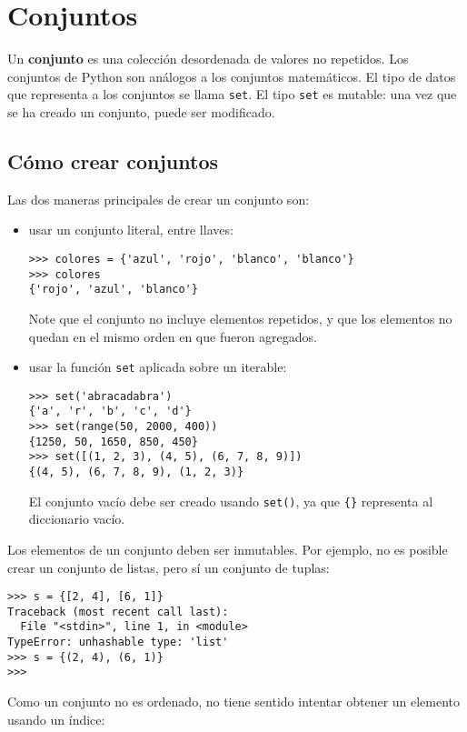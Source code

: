\chapter{Conjuntos}

Un \textbf{conjunto} es una colección desordenada de valores no
repetidos.
Los conjuntos de Python son análogos a los conjuntos matemáticos. El
tipo de datos que representa a los conjuntos se llama \lstinline!set!.
El tipo \lstinline!set! es mutable: una vez que se ha creado un
conjunto, puede ser modificado.

\section{Cómo crear conjuntos}

Las dos maneras principales de crear un conjunto son:

\begin{itemize}
\item
  usar un conjunto literal, entre llaves:
\begin{lstlisting}
>>> colores = {'azul', 'rojo', 'blanco', 'blanco'}
>>> colores
{'rojo', 'azul', 'blanco'}
\end{lstlisting}
  Note que el conjunto no incluye elementos repetidos, y que los
  elementos no quedan en el mismo orden en que fueron agregados.

\item
  usar la función \lstinline!set! aplicada sobre un iterable:
\begin{lstlisting}
>>> set('abracadabra')
{'a', 'r', 'b', 'c', 'd'}
>>> set(range(50, 2000, 400))
{1250, 50, 1650, 850, 450}
>>> set([(1, 2, 3), (4, 5), (6, 7, 8, 9)])
{(4, 5), (6, 7, 8, 9), (1, 2, 3)}
\end{lstlisting}

  El conjunto vacío debe ser creado usando \lstinline!set()!, ya que
  \lstinline!{}! representa al diccionario vacío.
\end{itemize}

Los elementos de un conjunto deben ser inmutables. Por ejemplo, no es
posible crear un conjunto de listas, pero sí un conjunto de tuplas:

\begin{lstlisting}
>>> s = {[2, 4], [6, 1]}
Traceback (most recent call last):
  File "<stdin>", line 1, in <module>
TypeError: unhashable type: 'list'
>>> s = {(2, 4), (6, 1)}
>>>
\end{lstlisting}

Como un conjunto no es ordenado, no tiene sentido intentar obtener un
elemento usando un índice:

